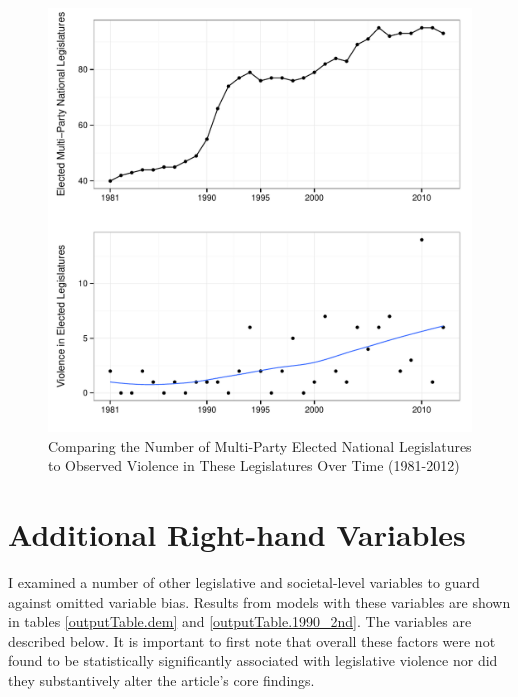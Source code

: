 \documentclass[a4paper]{article}\usepackage[]{graphicx}\usepackage[]{color}
\newenvironment{knitrout}{}{} %
\begin{document}
\begin{figure}

    \begin{center}
\begin{knitrout}
\color{fgcolor}
\includegraphics[width=0.8\linewidth]{figure/compareLegToViolence-1} 

\end{knitrout}
    \end{center}

    \caption{Comparing the Number of Multi-Party Elected National Legislatures to Observed Violence in These Legislatures Over Time (1981-2012)}
    \label{elect_vs_violence}

\end{figure}

\section*{Additional Right-hand Variables}


I examined a number of other legislative and societal-level variables to guard against omitted variable bias. Results from models with these variables are shown in tables \ref{outputTable.dem} and \ref{outputTable.1990_2nd}. The variables are described below. It is important to first note that overall these factors were not found to be statistically significantly associated with legislative violence nor did they substantively alter the article's core findings.
\end{document}
